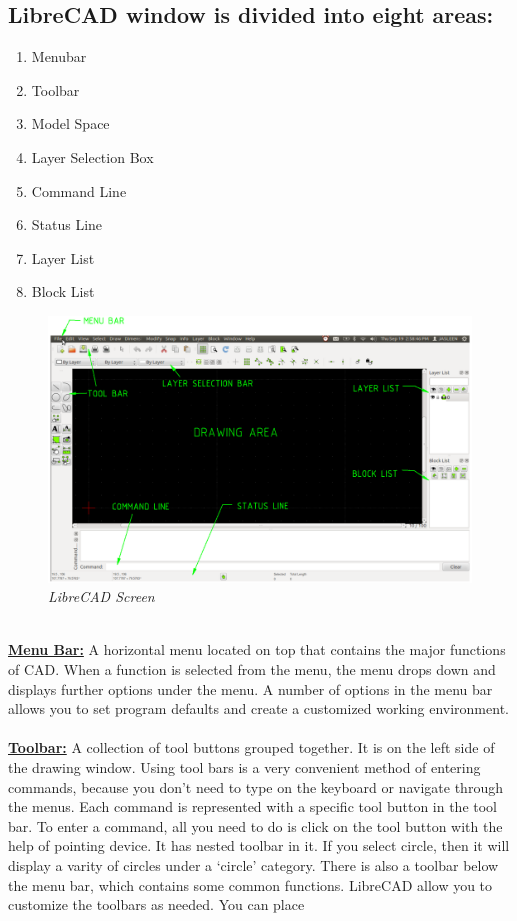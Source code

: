 \subsection*{LibreCAD window is divided into eight areas:}
\begin{enumerate}
\item{Menubar}
\item{Toolbar}
\item{Model Space}
\item{Layer Selection Box}
\item{Command Line}
\item{Status Line}
\item{Layer List}
\item{Block List}
\end{enumerate}
%
\begin{figure}[h!]
\centering\includegraphics[width=450px]{./images/labelscreen.png}
\caption{\small \sl LibreCAD Screen}
\end{figure}
%
\textbf{\\\underline{Menu Bar:}}
A horizontal menu located on top that contains the major functions of CAD. When a function is selected from the menu, the menu drops down and displays further options under the menu. A number of options in the menu bar allows you to set program defaults and create a customized working environment.
\\\\
\textbf{\underline{Toolbar:}}
A collection of tool buttons grouped together. It is on the left side of the drawing window. Using tool bars is a very convenient method of entering commands, because you don't need to type on the keyboard or navigate through the menus. Each command is represented with a specific tool button in the tool bar. To enter a command, all you need to do is click on the tool button with the help of pointing device. It has nested toolbar in it. If you select circle, then it will display a varity of circles under a `circle' category. There is also a toolbar below the menu bar, which contains some common functions. LibreCAD allow you to customize the toolbars as needed. You can place
